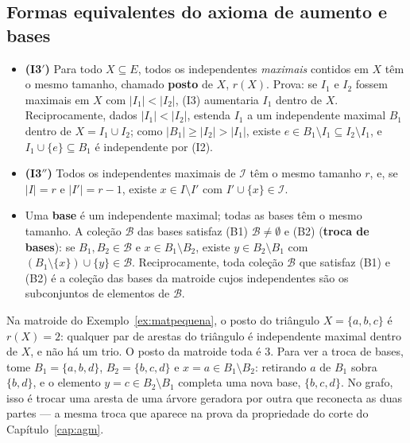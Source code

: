\subsection{Formas equivalentes do axioma de aumento e bases}
\begin{itemize}
  \item \textbf{(I3$'$)} Para todo $X\subseteq E$, todos os independentes \emph{maximais} contidos em $X$ têm o mesmo tamanho, chamado \textbf{posto} de $X$, $r(X)$. Prova: se $I_1$ e $I_2$ fossem maximais em $X$ com $|I_1|<|I_2|$, (I3) aumentaria $I_1$ dentro de $X$. Reciprocamente, dados $|I_1|<|I_2|$, estenda $I_1$ a um independente maximal $B_1$ dentro de $X=I_1\cup I_2$; como $|B_1|\ge|I_2|>|I_1|$, existe $e\in B_1\setminus I_1\subseteq I_2\setminus I_1$, e $I_1\cup\{e\}\subseteq B_1$ é independente por (I2).
  \item \textbf{(I3$''$)} Todos os independentes maximais de $\mathcal I$ têm o mesmo tamanho $r$, e, se $|I|=r$ e $|I'|=r-1$, existe $x\in I\setminus I'$ com $I'\cup\{x\}\in\mathcal I$.
  \item Uma \textbf{base} é um independente maximal; todas as bases têm o mesmo tamanho. A coleção $\mathcal B$ das bases satisfaz (B1) $\mathcal B\ne\emptyset$ e (B2) (\textbf{troca de bases}): se $B_1,B_2\in\mathcal B$ e $x\in B_1\setminus B_2$, existe $y\in B_2\setminus B_1$ com $(B_1\setminus\{x\})\cup\{y\}\in\mathcal B$. Reciprocamente, toda coleção $\mathcal B$ que satisfaz (B1) e (B2) é a coleção das bases da matroide cujos independentes são os subconjuntos de elementos de $\mathcal B$.
\end{itemize}

\begin{exemplo}\label{ex:posto}
Na matroide do Exemplo~\ref{ex:matpequena}, o posto do triângulo $X=\{a,b,c\}$ é $r(X)=2$: qualquer par de arestas do triângulo é independente maximal dentro de $X$, e não há um trio. O posto da matroide toda é 3. Para ver a troca de bases, tome $B_1=\{a,b,d\}$, $B_2=\{b,c,d\}$ e $x=a\in B_1\setminus B_2$: retirando $a$ de $B_1$ sobra $\{b,d\}$, e o elemento $y=c\in B_2\setminus B_1$ completa uma nova base, $\{b,c,d\}$. No grafo, isso é trocar uma aresta de uma árvore geradora por outra que reconecta as duas partes --- a mesma troca que aparece na prova da propriedade do corte do Capítulo~\ref{cap:agm}.
\end{exemplo}

